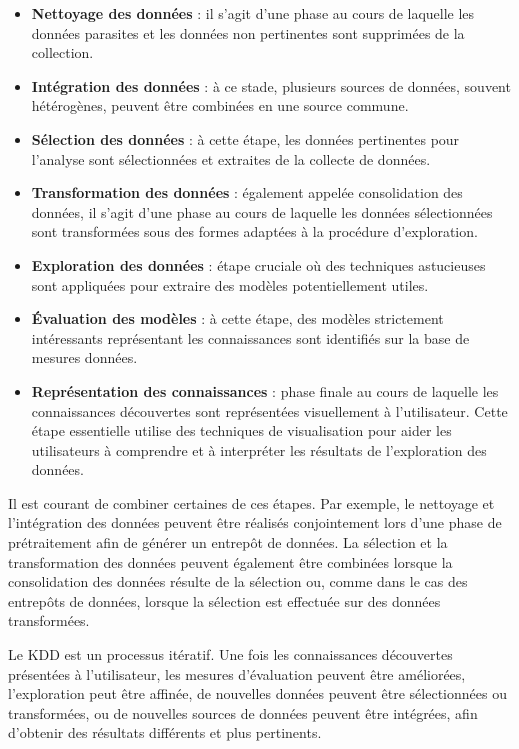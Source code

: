 \documentclass[a4paper,12pt]{report}
\begin{document}
        \begin{itemize}
            \item \textbf{Nettoyage des données} : il s’agit d’une phase au cours de laquelle les données parasites et les données non pertinentes sont supprimées de la collection.
            \item \textbf{Intégration des données} : à ce stade, plusieurs sources de données, souvent hétérogènes, peuvent être combinées en une source commune.
            \item \textbf{Sélection des données} : à cette étape, les données pertinentes pour l’analyse sont sélectionnées et extraites de la collecte de données.
            \item \textbf{Transformation des données} : également appelée consolidation des données, il s’agit d’une phase au cours de laquelle les données sélectionnées sont transformées sous des formes adaptées à la procédure d’exploration.
            \item \textbf{Exploration des données} : étape cruciale où des techniques astucieuses sont appliquées pour extraire des modèles potentiellement utiles.
            \item \textbf{Évaluation des modèles} : à cette étape, des modèles strictement intéressants représentant les connaissances sont identifiés sur la base de mesures données.
            \item \textbf{Représentation des connaissances} : phase finale au cours de laquelle les connaissances découvertes sont représentées visuellement à l’utilisateur. Cette étape essentielle utilise des techniques de visualisation pour aider les utilisateurs à comprendre et à interpréter les résultats de l’exploration des données. \\
        
        \end{itemize}

        Il est courant de combiner certaines de ces étapes. Par exemple, le nettoyage et l'intégration des données peuvent être réalisés conjointement lors d'une phase de prétraitement afin de générer un entrepôt de données. La sélection et la transformation des données peuvent également être combinées lorsque la consolidation des données résulte de la sélection ou, comme dans le cas des entrepôts de données, lorsque la sélection est effectuée sur des données transformées.

        Le KDD est un processus itératif. Une fois les connaissances découvertes présentées à l'utilisateur, les mesures d'évaluation peuvent être améliorées, l'exploration peut être affinée, de nouvelles données peuvent être sélectionnées ou transformées, ou de nouvelles sources de données peuvent être intégrées, afin d'obtenir des résultats différents et plus pertinents.
\end{document}
